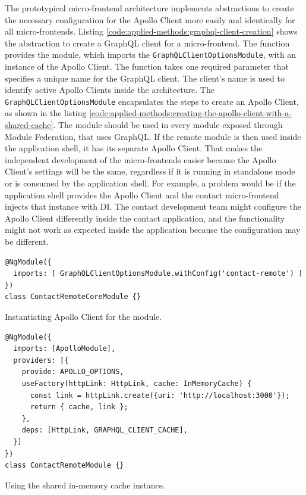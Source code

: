 \noindent The prototypical micro-frontend architecture implements abstractions to create the necessary configuration for the Apollo Client more easily and identically for all micro-frontends. Listing \ref{code:applied-methods:graphql-client-creation} shows the abstraction to create a GraphQL client for a micro-frontend. The function provides the module, which imports the \texttt{GraphQLClientOptionsModule}, with an instance of the Apollo Client. The function takes one required parameter that specifies a unique name for the GraphQL client. The client's name is used to identify active Apollo Clients inside the architecture. The \texttt{GraphQLClientOptionsModule} encapsulates the steps to create an Apollo Client, as shown in the listing \ref{code:applied-methods:creating-the-apollo-client-with-a-shared-cache}. The module should be used in every module exposed through Module Federation, that uses GraphQL. If the remote module is then used inside the application shell, it has its separate Apollo Client. That makes the independent development of the micro-frontends easier because the Apollo Client's settings will be the same, regardless if it is running in standalone mode or is consumed by the application shell. For example, a problem would be if the application shell provides the Apollo Client and the contact micro-frontend injects that instance with \ac{DI}. The contact development team might configure the Apollo Client differently inside the contact application, and the functionality might not work as expected inside the application because the configuration may be different.

\ifshowListings
  \begin{listing}[H]
    \begin{verbatim}
@NgModule({
  imports: [ GraphQLClientOptionsModule.withConfig('contact-remote') ]
})
class ContactRemoteCoreModule {}
    \end{verbatim}
  \caption{Instantiating Apollo Client for the module.}\label{code:applied-methods:graphql-client-creation}
  \end{listing}
\fi

\ifshowListings
\begin{listing}[H]
\begin{verbatim}
@NgModule({
  imports: [ApolloModule],
  providers: [{
    provide: APOLLO_OPTIONS,
    useFactory(httpLink: HttpLink, cache: InMemoryCache) {
      const link = httpLink.create({uri: 'http://localhost:3000'});
      return { cache, link };
    },
    deps: [HttpLink, GRAPHQL_CLIENT_CACHE],
  }]
})
class ContactRemoteModule {}
\end{verbatim}
\caption{Using the shared in-memory cache instance.}\label{code:applied-methods:creating-the-apollo-client-with-a-shared-cache}
\end{listing}
\fi

